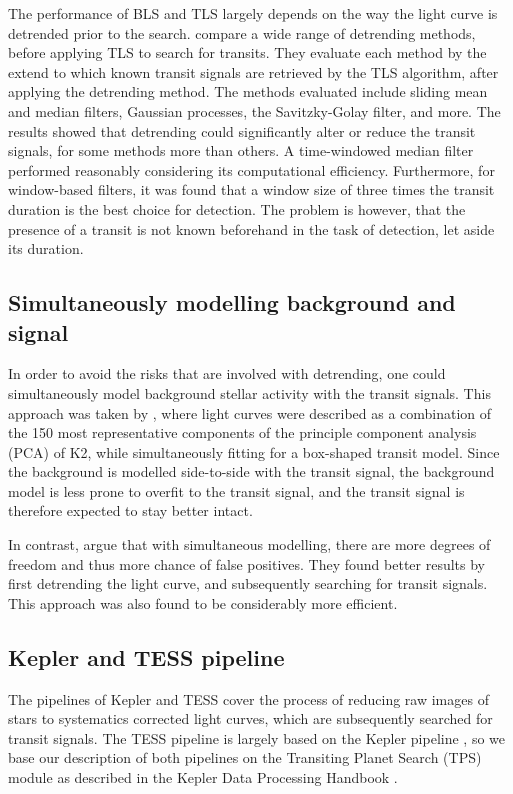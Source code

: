 The performance of BLS and TLS largely depends on the way the light curve is detrended prior to the search. \cite{hippke2019wotan} compare a wide range of detrending methods, before applying TLS to search for transits. They evaluate each method by the extend to which known transit signals are retrieved by the TLS algorithm, after applying the detrending method. The methods evaluated include sliding mean and median filters, Gaussian processes, the Savitzky-Golay filter, and more. The results showed that detrending could significantly alter or reduce the transit signals, for some methods more than others. A time-windowed median filter performed reasonably considering its computational efficiency. Furthermore, for window-based filters, it was found that a window size of three times the transit duration is the best choice for detection. The problem is however, that the presence of a transit is not known beforehand in the task of detection, let aside its duration.

\subsection{Simultaneously modelling background and signal}

In order to avoid the risks that are involved with detrending, one could simultaneously model background stellar activity with the transit signals. This approach was taken by \cite{foreman2015systematic}, where light curves were described as a combination of the 150 most representative components of the principle component analysis (PCA) of K2, while simultaneously fitting for a box-shaped transit model. Since the background is modelled side-to-side with the transit signal, the background model is less prone to overfit to the transit signal, and the transit signal is therefore expected to stay better intact.

In contrast, \cite{kovacs2016periodic} argue that with simultaneous modelling, there are more degrees of freedom and thus more chance of false positives. They found better results by first detrending the light curve, and subsequently searching for transit signals. This approach was also found to be considerably more efficient.

\subsection{Kepler and TESS pipeline}

The pipelines of Kepler and TESS cover the process of reducing raw images of stars to systematics corrected light curves, which are subsequently searched for transit signals. The TESS pipeline is largely based on the Kepler pipeline \citep{jenkins2016tess}, so we base our description of both pipelines on the Transiting Planet Search (TPS) module as described in the Kepler Data Processing Handbook \cite{jenkins2017kepler}. 

